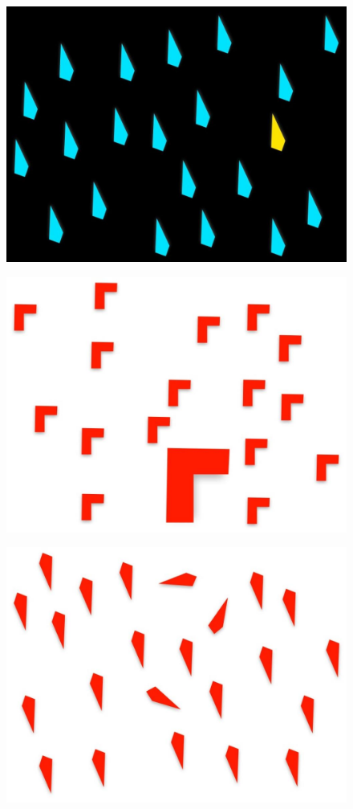 \documentclass[10pt]{beamer}
\begin{document}
\begin{frame}{}
    \begin{figure}
        \centering
        \includegraphics[width=0.8\linewidth]{./img/syntheticData5.jpg}
    \end{figure}
\end{frame}

\begin{frame}{}
    \begin{figure}
        \centering
        \includegraphics[width=0.8\linewidth]{./img/syntheticData1.jpg}
    \end{figure}
\end{frame}

\begin{frame}{}
    \begin{figure}
        \centering
        \includegraphics[width=0.8\linewidth]{./img/syntheticData3.jpg}
    \end{figure}
\end{frame}
\end{document}
